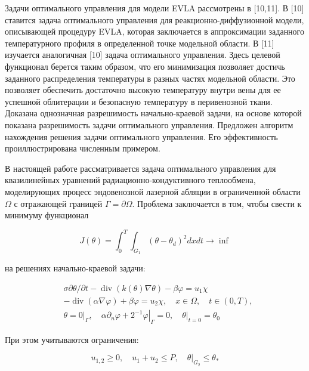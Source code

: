 Задачи оптимального управления для модели EVLA рассмотрены в [10,11].
В [10] ставится задача оптимального управления для реакционно-диффузионной модели,
описывающей процедуру EVLA, которая заключается в аппроксимации заданного температурного
профиля в определенной точке модельной области.
В [11] изучается аналогичная [10] задача оптимального управления.
Здесь целевой функционал берется таким образом, что его минимизация позволяет достичь
заданного распределения температуры в разных частях модельной области.
Это позволяет обеспечить достаточно высокую температуру внутри вены для ее успешной
облитерации и безопасную температуру в перивенозной ткани.
Доказана однозначная разрешимость начально-краевой задачи,
на основе которой показана разрешимость задачи оптимального управления.
Предложен алгоритм нахождения решения задачи оптимального управления.
Его эффективность проиллюстрирована численным примером.


В настоящей работе рассматривается задача оптимального управления для квазилинейных
уравнений радиационно-кондуктивного теплообмена, моделирующих процесс эндовенозной
лазерной абляции в ограниченной области $\Omega$ с отражающей границей $\Gamma=\partial\Omega$.
Проблема заключается в том, чтобы свести к минимуму функционал

\[ J(\theta)=\int_{0}^{T} \int_{G_{1}}\left(\theta-\theta_{d}\right)^{2} d x d t \rightarrow \inf \]

на решениях начально-краевой задачи:

\[
    \begin{aligned}
        &\sigma \partial \theta / \partial t-\operatorname{div}(k(\theta)
        \nabla \theta)-\beta \varphi=u_{1} \chi \\
        &-\operatorname{div}(\alpha \nabla \varphi)+\beta \varphi=u_{2}
        \chi, \quad x \in \Omega, \quad t \in(0, T), \\
        &\theta=\left.0\right|_{\Gamma}, \quad \alpha \partial_{n}
        \varphi+\left.2^{-1} \varphi\right|_{\Gamma}=0,\left.\quad \theta\right|_{t=0}=\theta_{0}
    \end{aligned}
\]

При этом учитываются ограничения:

\[
    u_{1,2} \geq 0, \quad u_{1}+u_{2} \leq P,\left.\quad \theta\right|_{G_{2}} \leq \theta_{*}
\]

